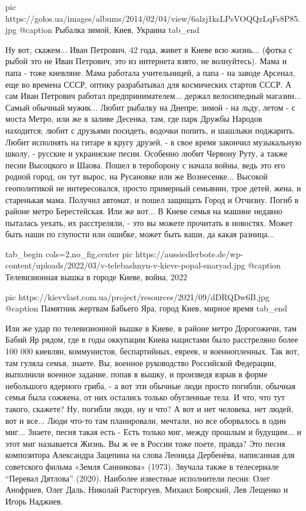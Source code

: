 		 pic https://golos.ua/images/albums/2014/02/04/view/6alzj1ksLPsVOQQzLqFs8P85.jpg
		 @caption Рыбалка зимой, Киев, Украина
  tab_end
\fi

Ну вот, скажем...  Иван Петрович, 42 года, живет в Киеве всю жизнь... (фотка с
рыбой это не Иван Петрович, это из интернета взято, не волнуйтесь). Мама и папа
- тоже киевляне.  Мама работала учительницей, а папа - на заводе Арсенал, еще
во времена СССР, оптику разрабатывал для космических стартов СССР.  А сам Иван
Петрович работал предпринимателем... держал велосипедный магазин... Самый
обычный мужик...  Любит рыбалку на Днепре; зимой - на льду, летом - с моста
Метро, или же в заливе Десенка, там, где парк Дружбы Народов находится; любит с
друзьями посидеть, водочки попить, и шашлыки поджарить.  Любит исполнять на
гитаре в кругу друзей, - в свое время закончил музыкальную школу, - русские и
украинские песни.  Особенно любит Червону Руту, а также песни Высоцкого и
Шаова.  Пошел в тероборону с начала войны, ведь это его родной город, он тут
вырос, на Русановке или же Вознесенке... Высокой геополитикой не интересовался,
просто примерный семьянин, трое детей, жена, и старенькая мама.  Получил
автомат, и пошел защищать Город и Отчизну. Погиб в районе метро Берестейская.
Или же вот... В Киеве семья на машине недавно пыталась уехать, их расстреляли,
- это вы можете прочитать в новостях. Может быть наши по глупости или ошибке,
может быть ваши, да какая разница... 

\ifcmt
  tab_begin cols=2,no_fig,center
     pic https://aussiedlerbote.de/wp-content/uploads/2022/03/v-telebashnyu-v-kieve-popal-snaryad.jpg
		 @caption Телевизионная вышка в городе Киеве, война, 2022

		 pic https://kievvlast.com.ua/project/resources/2021/09/dDRQDw6B.jpg
		 @caption Памятник жертвам Бабьего Яра, город Киев, мирное время
  tab_end
\fi

Или же удар по телевизионной вышке в
Киеве, в районе метро Дорогожичи, там Бабий Яр рядом, где в годы оккупации
Киева нацистами было расстреляно более 100 000 киевлян, коммунистов,
беспартийных, евреев, и военнопленных. Так вот, там гуляла семья, знаете. Вы,
военное руководство Российской Федерации, выполнили военное задание, попав в
вышку, и произведя взрыв в форме небольшого ядерного гриба, - а вот эти обычные
люди просто погибли, обычная семья была сожжена, от них остались только
обугленные тела.  И что, что тут такого, скажете? Ну, погибли люди, ну и что? А
вот и нет человека, нет людей, вот и все... Люди что-то там планировали,
мечтали, но все оборвалось в один миг...  Знаете, песня такая есть - Есть
только миг, между прошлым и будущим...  и этот миг называется Жизнь. Вы ж ее в
России тоже поете, правда?  Это песня композитора Александра Зацепина на слова
Леонида Дербенёва, написанная для советского фильма «Земля Санникова» (1973).
Звучала также в телесериале \enquote{Перевал Дятлова} (2020). Наиболее
известные исполнители песни: Олег Анофриев, Олег Даль, Николай Расторгуев,
Михаил Боярский, Лев Лещенко и Игорь Наджиев.

